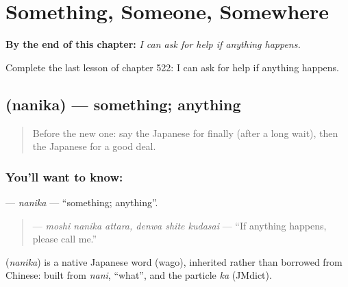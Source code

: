 
\chapter{Something, Someone, Somewhere}
\label{ch:ja-something-someone-somewhere}

\begin{chapteropening}
\textbf{By the end of this chapter:} \emph{I can ask for help if anything happens.}

Complete the last lesson of chapter 522: I can ask for help if anything happens.
\end{chapteropening}

\section[\texorpdfstring{\ja{なにか} (nanika)}{なにか (nanika)}]{ (nanika) — something; anything}

\label{lesson:JA-C522-nanika}



\begin{quote}
Before the new one: say the Japanese for finally (after a long wait), then the Japanese for a good deal.
\end{quote}

\subsection*{You'll want to know: }
\textbf{} — \emph{nanika} — \textquotedblleft{}something; anything\textquotedblright{}.

\begin{quote}
\textbf{   } — \emph{moshi nanika attara, denwa shite kudasai} — \textquotedblleft{}If anything happens, please call me.\textquotedblright{}
\end{quote}

\begin{cousinweb}
\textbf{} (\emph{nanika}) is a native Japanese word (wago), inherited rather than borrowed from Chinese: built from \emph{nani}, \textquotedblleft{}what\textquotedblright{}, and the particle \emph{ka} (JMdict).
\end{cousinweb}

